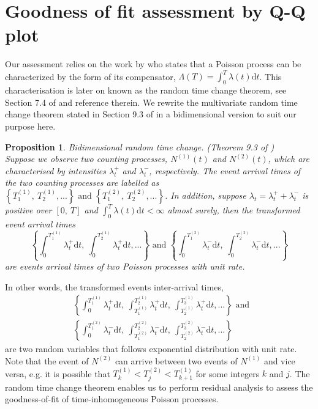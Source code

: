 \documentclass[11pt,a4paper]{article}
\numberwithin{equation}{section}
\newtheorem{proposition}[theorem]{Proposition}
\theoremstyle{remark}
\theoremstyle{definition}
\begin{document}
\section{Goodness of fit assessment by Q-Q plot}\label{sec:QQplot}
Our assessment relies on the work by \cite{watanabe1964discontinuous} who states that a Poisson process can be characterized by the form of its compensator, $\Lambda(T)=\int_0^T\lambda(t)\text{d}t$.
 This characterisation is later on known as the random time change theorem, see Section 7.4 of \citep{daley2003introduction} and reference therein.
 We rewrite the multivariate random time change theorem stated in Section 9.3 of \cite{laub2021elements} in a bidimensional version to suit our purpose here.
 \begin{proposition}
Bidimensional random time change. (Theorem 9.3 of \cite{laub2021elements}) \\
Suppose we observe two counting processes, $N^{(1)}(t)$ and $N^{(2)}(t)$, which are characterised by intensities $\lambda^{+}_t$ and $\lambda^{-}_t$, respectively.
 The event arrival times of the two counting processes are labelled as
  $\left\{T^{(1)}_1,\ T^{(1)}_2,...\right\}\text{ and } \left\{T^{(2)}_1,\ T^{(2)}_2,...\right\} $.
 In addition, suppose $\lambda_t = \lambda^{+}_t +\lambda^{-}_t$ is positive over $[0,\ T]$ and
 $\int_0^T \lambda(t) \text{d}t < \infty$ almost surely, then the transformed event arrival times
 \begin{equation*}
    \left\{\int_0^{T^{(1)}_1}\lambda^+_t \text{d}t,\ \int_{0}^{T^{(1)}_2}\lambda^+_t \text{d}t,...\right\} \text{ and }
    \left\{\int_0^{T^{(2)}_1}\lambda^-_t \text{d}t,\ \int_{0}^{T^{(2)}_2}\lambda^-_t \text{d}t,...\right\}
 \end{equation*}
 are events arrival times of two Poisson processes with unit rate.
\end{proposition}

In other words, the transformed events inter-arrival times,
\begin{align*}
  &\left\{\int_0^{T^{(1)}_1}\lambda^+_t \text{d}t,\ \int_{T^{(1)}_1}^{T^{(1)}_2}\lambda^+_t \text{d}t,\ \int_{T^{(1)}_2}^{T^{(1)}_3}\lambda^+_t \text{d}t,...\right\} \text{ and }\\
  &\left\{\int_0^{T^{(2)}_1}\lambda^-_t \text{d}t,\ \int_{T^{(2)}_1}^{T^{(2)}_2}\lambda^-_t \text{d}t,\ \int_{T^{(2)}_2}^{T^{(2)}_3}\lambda^-_t \text{d}t,...\right\}
\end{align*}
are two random variables that follows exponential distribution with unit rate.
Note that the event of $N^{(2)}$ can arrive between two events of $N^{(1)}$ and vice versa, e.g. it is possible that
$T^{(1)}_{k} < T^{(2)}_{j} < T^{(1)}_{k+1}$ for some integers $k$ and $j$.
The random time change theorem enables us to perform residual analysis to assess the goodness-of-fit of time-inhomogeneous Poisson processes.
\end{document}
